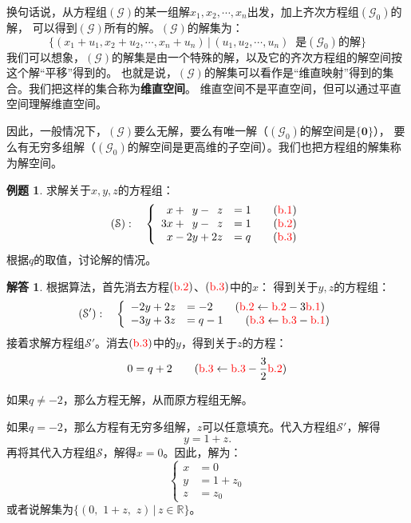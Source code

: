 \documentclass[12pt,UTF8]{ctexbook}
\theoremstyle{definition}
\newtheorem{et}{例题}[section]
\newtheorem*{so}{解答}
\theoremstyle{plain}
\begin{document}
换句话说，从方程组$(\mathcal{G})$的某一组解$x_1, x_2, \cdots , x_n$出发，加上齐次方程组$(\mathcal{G}_0)$的解，
可以得到$(\mathcal{G})$所有的解。$(\mathcal{G})$的解集为：
$$ \{(x_1+u_1, x_2+u_2, \cdots , x_n+u_n) \, | \, (u_1, u_2, \cdots, u_n) \;\; \mbox{是}(\mathcal{G}_0)\mbox{的解} \} $$
我们可以想象，$(\mathcal{G})$的解集是由一个特殊的解，以及它的齐次方程组的解空间按这个解“平移”得到的。
也就是说，$(\mathcal{G})$的解集可以看作是“维直映射”得到的集合。我们把这样的集合称为\textbf{维直空间}。
维直空间不是平直空间，但可以通过平直空间理解维直空间。

因此，一般情况下，$(\mathcal{G})$要么无解，要么有唯一解（$(\mathcal{G}_0)$的解空间是$\{\mathbf{0}\}$），
要么有无穷多组解（$(\mathcal{G}_0)$的解空间是更高维的子空间）。我们也把方程组的解集称为解空间。

\begin{et}
    求解关于$x,y,z$的方程组：
    $$ (\mathcal{S}):\quad \left\{
        \begin{array}{rl}
            \phantom{0}x + \phantom{0}y - \phantom{0}z &= 1 \quad \quad ({\color{red}\mathrm{b}.1})\\
            3x + \phantom{0}y - \phantom{0}z &= 1  \quad \quad ({\color{red}\mathrm{b}.2}) \\
            \phantom{0}x - 2y  + 2z &= q  \quad \quad ({\color{red}\mathrm{b}.3}) \\
    \end{array}
    \right. $$
    根据$q$的取值，讨论解的情况。
    
\end{et}

\begin{so}
    根据算法，首先消去方程$({\color{red}\mathrm{b}.2})$、$({\color{red}\mathrm{b}.3})$中的$x$：
    得到关于$y,z$的方程组：
    $$ (\mathcal{S'}):\quad \left\{
        \begin{array}{rl}
            -2y + 2z &= -2  \quad \quad ({{\color{red}\mathrm{b}.2} \leftarrow {\color{red}\mathrm{b}.2} - 3\color{red}\mathrm{b}.1}) \\
            -3y  + 3z &= q - 1  \quad \quad ({{\color{red}\mathrm{b}.3} \leftarrow {\color{red}\mathrm{b}.3} - \color{red}\mathrm{b}.1})
    \end{array}
    \right. $$
    接着求解方程组$\mathcal{S'}$。消去$({\color{red}\mathrm{b}.3})$中的$y$，得到关于$z$的方程：
    $$ 0 = q + 2 \quad \quad ({{\color{red}\mathrm{b}.3} \leftarrow {\color{red}\mathrm{b}.3} - \frac{3}{2}\color{red}\mathrm{b}.2})$$
    
    如果$q \neq -2$，那么方程无解，从而原方程组无解。

    如果$q = -2$，那么方程有无穷多组解，$z$可以任意填充。代入方程组$\mathcal{S'}$，解得
    $$ y = 1 + z.$$
    再将其代入方程组$\mathcal{S}$，解得$x = 0$。因此，解为：
    $$ \left\{
    \begin{array}{rl}
    x &= 0 \\
    y &= 1 + z_0\\
    z &= z_0
    \end{array}
    \right. $$
    或者说解集为$\{(0, \,\,1 + z,\,\, z) \, | \, z\in \mathbb{R}\}$。

\end{so}
\end{document}
